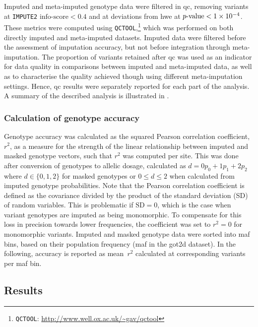 %

%

Imputed and meta-imputed genotype data were filtered in \gls{qc}, removing variants at \texttt{IMPUTE2} ${\mbox{info-score}<0.4}$ and at deviations from \gls{hwe} at ${\mbox{$p$-value}<\num{1e-4}}$.
These metrics were computed using \texttt{QCTOOL},\footnote{\texttt{QCTOOL}: \url{http://www.well.ox.ac.uk/~gav/qctool} } which was performed on both directly imputed and meta-imputed datasets.
Imputed data were filtered before the assessment of imputation accuracy, but not before integration through meta-imputation.
The proportion of variants retained after \gls{qc} was used as an indicator for data quality in comparisons between imputed and meta-imputed data, as well as to characterise the quality achieved though using different meta-imputation settings.
Hence, \gls{qc} results were separately reported for each part of the analysis.
A summary of the described analysis is illustrated in .



\subsubsection{Calculation of genotype accuracy}

Genotype accuracy was calculated as the squared Pearson correlation coefficient, $r^2$, as a measure for the strength of the linear relationship between imputed and masked genotype vectors, such that $r^2$ was computed per site.
This was done after conversion of genotypes to allelic dosage, calculated as ${d=0p_{0}+1p_{1}+2p_{2}}$ where ${d \in \lbrace 0,1,2 \rbrace}$ for masked genotypes or ${0 \leq d \leq 2}$ when calculated from imputed genotype probabilities.
Note that the Pearson correlation coefficient is defined as the covariance divided by the product of the standard deviation (SD) of  random variables.
This is problematic if $\text{SD}=0$, which is the case when variant genotypes are imputed as being monomorphic.
To compensate for this loss in precision towards lower frequencies, the coefficient was set to ${r^2=0}$ for monomorphic variants.
Imputed and masked genotype data were sorted into \gls{maf} bins, based on their population frequency (\gls{maf} in the \gls{got2d} dataset).
In the following, accuracy is reported as mean~$r^2$ calculated at corresponding variants per \gls{maf} bin.


%
\subsection{Results}
\label{metaimpute_accuracy_results}
%

